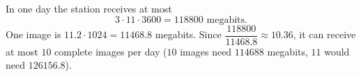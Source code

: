 In one day the station receives at most
\[3\cdot11\cdot3600=118800\text{ megabits}.\]
One image is $11.2\cdot1024=11468.8$ megabits. Since $\dfrac{118800}{11468.8}\approx10.36$, it can receive at most $\boxed{10}$ complete images per day ($10$ images need $114688$ megabits, $11$ would need $126156.8$).
